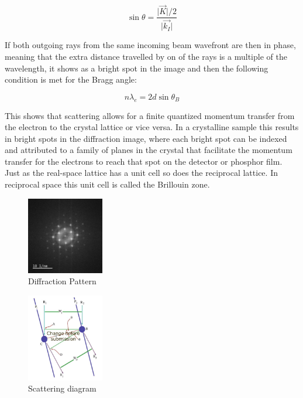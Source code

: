 \begin{equation}
    \sin{\theta}=\frac{\vert \vec{K}\vert / 2}{\vert \vec{k_I}\vert}
    \label{eq:bragg_angle}
\end{equation}

If both outgoing rays from the same incoming beam wavefront are then in phase, meaning that the extra distance travelled by on of the rays is a multiple of the wavelength, it shows as a bright spot in the image and then the following condition is met for the Bragg angle:

\begin{equation}
    n \lambda_e = 2 d \sin{\theta_B}
    \label{eq:bragg_angle_ser}
\end{equation}

This shows that scattering allows for a finite quantized momentum transfer from the electron to the crystal lattice or vice versa. In a crystalline sample this results in bright spots in the diffraction image, where each bright spot can be indexed and attributed to a family of planes in the crystal that facilitate the momentum transfer for the electrons to reach that spot on the detector or phosphor film.
Just as the real-space lattice has a unit cell so does the reciprocal lattice. In reciprocal space this unit cell is called the Brillouin zone.

\begin{figure}
    \centering
    \includegraphics[width=0.3\textwidth, keepaspectratio]{resources/Figures/fft_of_ml.png}
    \caption{Diffraction Pattern}
    \label{fig:diffraction_pattern}
\end{figure}

\begin{figure}
    \centering
    \includegraphics[width=0.3\textwidth, keepaspectratio]{resources/Figures/scattering.png}
    \caption{Scattering diagram}
    \label{fig:scatt_angle}
\end{figure}

